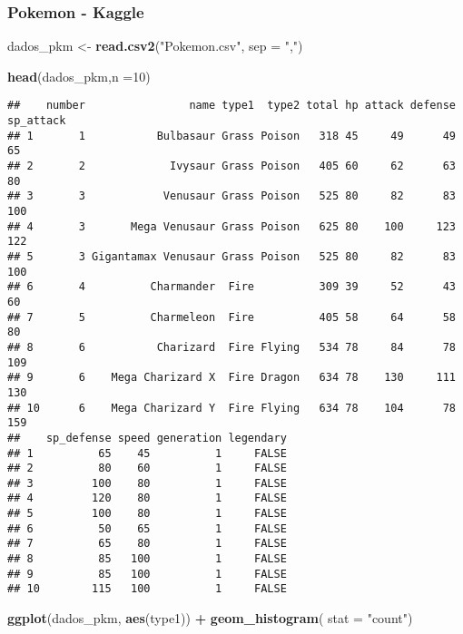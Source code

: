 \documentclass[
]{article}
\newenvironment{Shaded}{\begin{snugshade}}{\end{snugshade}}
\newcommand{\AttributeTok}[1]{\textcolor[rgb]{0.13,0.29,0.53}{#1}}
\newcommand{\DecValTok}[1]{\textcolor[rgb]{0.00,0.00,0.81}{#1}}
\newcommand{\FunctionTok}[1]{\textcolor[rgb]{0.13,0.29,0.53}{\textbf{#1}}}
\newcommand{\NormalTok}[1]{#1}
\newcommand{\OtherTok}[1]{\textcolor[rgb]{0.56,0.35,0.01}{#1}}
\newcommand{\SpecialCharTok}[1]{\textcolor[rgb]{0.81,0.36,0.00}{\textbf{#1}}}
\newcommand{\StringTok}[1]{\textcolor[rgb]{0.31,0.60,0.02}{#1}}
\begin{document}
\subsubsection{Pokemon - Kaggle}\label{pokemon---kaggle}

\begin{Shaded}
\begin{Highlighting}[]
\NormalTok{dados\_pkm }\OtherTok{\textless{}{-}} \FunctionTok{read.csv2}\NormalTok{(}\StringTok{"Pokemon.csv"}\NormalTok{, }\AttributeTok{sep =} \StringTok{","}\NormalTok{)}

\FunctionTok{head}\NormalTok{(dados\_pkm,}\AttributeTok{n =}\DecValTok{10}\NormalTok{)}
\end{Highlighting}
\end{Shaded}

\begin{verbatim}
##    number                name type1  type2 total hp attack defense sp_attack
## 1       1           Bulbasaur Grass Poison   318 45     49      49        65
## 2       2             Ivysaur Grass Poison   405 60     62      63        80
## 3       3            Venusaur Grass Poison   525 80     82      83       100
## 4       3       Mega Venusaur Grass Poison   625 80    100     123       122
## 5       3 Gigantamax Venusaur Grass Poison   525 80     82      83       100
## 6       4          Charmander  Fire          309 39     52      43        60
## 7       5          Charmeleon  Fire          405 58     64      58        80
## 8       6           Charizard  Fire Flying   534 78     84      78       109
## 9       6    Mega Charizard X  Fire Dragon   634 78    130     111       130
## 10      6    Mega Charizard Y  Fire Flying   634 78    104      78       159
##    sp_defense speed generation legendary
## 1          65    45          1     FALSE
## 2          80    60          1     FALSE
## 3         100    80          1     FALSE
## 4         120    80          1     FALSE
## 5         100    80          1     FALSE
## 6          50    65          1     FALSE
## 7          65    80          1     FALSE
## 8          85   100          1     FALSE
## 9          85   100          1     FALSE
## 10        115   100          1     FALSE
\end{verbatim}

\begin{Shaded}
\begin{Highlighting}[]
\FunctionTok{ggplot}\NormalTok{(dados\_pkm, }\FunctionTok{aes}\NormalTok{(type1)) }\SpecialCharTok{+} 
  \FunctionTok{geom\_histogram}\NormalTok{( }\AttributeTok{stat =} \StringTok{"count"}\NormalTok{)}
\end{Highlighting}
\end{Shaded}
\end{document}
